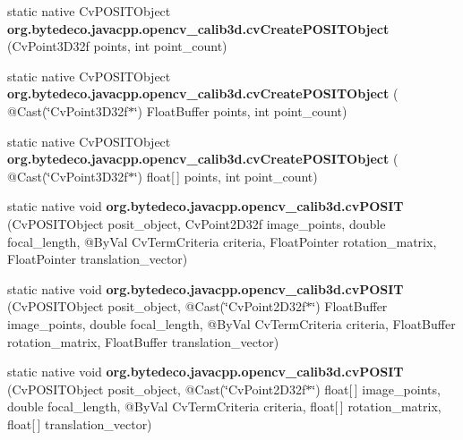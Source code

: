 \begin{DoxyCompactItemize}
\item 
\mbox{\label{group__calib3d__c_ga764337bf2a1f7a173b5753e270942356}} 
static native Cv\+P\+O\+S\+I\+T\+Object {\bfseries org.\+bytedeco.\+javacpp.\+opencv\+\_\+calib3d.\+cv\+Create\+P\+O\+S\+I\+T\+Object} (Cv\+Point3\+D32f points, int point\+\_\+count)
\item 
\mbox{\label{group__calib3d__c_ga67490ce21a71dcf85a8af707aa0d9ae3}} 
static native Cv\+P\+O\+S\+I\+T\+Object {\bfseries org.\+bytedeco.\+javacpp.\+opencv\+\_\+calib3d.\+cv\+Create\+P\+O\+S\+I\+T\+Object} ( @Cast(\char`\"{}Cv\+Point3\+D32f$\ast$\char`\"{}) Float\+Buffer points, int point\+\_\+count)
\item 
\mbox{\label{group__calib3d__c_ga0e061ef33f9b061a86011cdbbec6a22b}} 
static native Cv\+P\+O\+S\+I\+T\+Object {\bfseries org.\+bytedeco.\+javacpp.\+opencv\+\_\+calib3d.\+cv\+Create\+P\+O\+S\+I\+T\+Object} ( @Cast(\char`\"{}Cv\+Point3\+D32f$\ast$\char`\"{}) float\mbox{[}$\,$\mbox{]} points, int point\+\_\+count)
\item 
\mbox{\label{group__calib3d__c_ga114e389353e6772a9385d981fa909e1c}} 
static native void {\bfseries org.\+bytedeco.\+javacpp.\+opencv\+\_\+calib3d.\+cv\+P\+O\+S\+IT} (Cv\+P\+O\+S\+I\+T\+Object posit\+\_\+object, Cv\+Point2\+D32f image\+\_\+points, double focal\+\_\+length, @By\+Val Cv\+Term\+Criteria criteria, Float\+Pointer rotation\+\_\+matrix, Float\+Pointer translation\+\_\+vector)
\item 
\mbox{\label{group__calib3d__c_ga585ae07cd72592edc04a00709ccfd7c0}} 
static native void {\bfseries org.\+bytedeco.\+javacpp.\+opencv\+\_\+calib3d.\+cv\+P\+O\+S\+IT} (Cv\+P\+O\+S\+I\+T\+Object posit\+\_\+object, @Cast(\char`\"{}Cv\+Point2\+D32f$\ast$\char`\"{}) Float\+Buffer image\+\_\+points, double focal\+\_\+length, @By\+Val Cv\+Term\+Criteria criteria, Float\+Buffer rotation\+\_\+matrix, Float\+Buffer translation\+\_\+vector)
\item 
\mbox{\label{group__calib3d__c_gacc7652e0a0bc364da56a89cdc3784b2f}} 
static native void {\bfseries org.\+bytedeco.\+javacpp.\+opencv\+\_\+calib3d.\+cv\+P\+O\+S\+IT} (Cv\+P\+O\+S\+I\+T\+Object posit\+\_\+object, @Cast(\char`\"{}Cv\+Point2\+D32f$\ast$\char`\"{}) float\mbox{[}$\,$\mbox{]} image\+\_\+points, double focal\+\_\+length, @By\+Val Cv\+Term\+Criteria criteria, float\mbox{[}$\,$\mbox{]} rotation\+\_\+matrix, float\mbox{[}$\,$\mbox{]} translation\+\_\+vector)

\end{DoxyCompactItemize}
